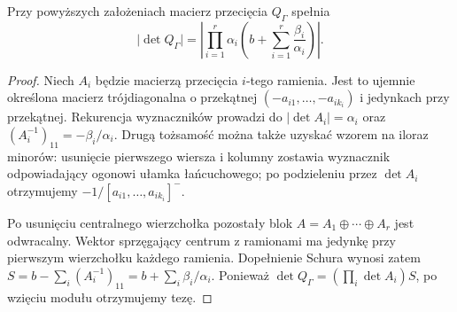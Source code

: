 \begin{stwierdzenie}
\label{prop:tg-star-determinant}
Przy powyższych założeniach macierz przecięcia
$Q_\Gamma$ spełnia
\[
\big|\det Q_\Gamma\big|=
\left|\prod_{i=1}^r\alpha_i
\left(b+\sum_{i=1}^r\frac{\beta_i}{\alpha_i}\right)\right|.
\]
\end{stwierdzenie}
\begin{proof}
Niech $A_i$ będzie macierzą przecięcia $i$-tego ramienia.
Jest to ujemnie określona macierz trójdiagonalna o
przekątnej $(-a_{i1},\ldots,-a_{ik_i})$ i jedynkach
przy przekątnej. Rekurencja wyznaczników prowadzi do
$|\det A_i|=\alpha_i$ oraz
$(A_i^{-1})_{11}=-\beta_i/\alpha_i$.
Drugą tożsamość można także uzyskać wzorem na iloraz
minorów: usunięcie pierwszego wiersza i kolumny
zostawia wyznacznik odpowiadający ogonowi ułamka
łańcuchowego; po podzieleniu przez $\det A_i$
otrzymujemy $-1/[a_{i1},\ldots,a_{ik_i}]^-$.

Po usunięciu centralnego wierzchołka pozostały blok
$A=A_1\oplus\cdots\oplus A_r$ jest odwracalny.
Wektor sprzęgający centrum z ramionami ma jedynkę
przy pierwszym wierzchołku każdego ramienia.
Dopełnienie Schura wynosi zatem
$S=b-\sum_i(A_i^{-1})_{11}=b+\sum_i\beta_i/\alpha_i$.
Ponieważ $\det Q_\Gamma=(\prod_i\det A_i)S$,
po wzięciu modułu otrzymujemy tezę.
\end{proof}

